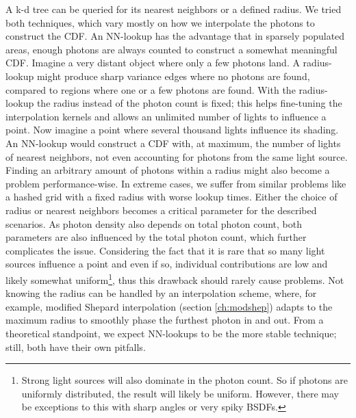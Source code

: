 A k-d tree can be queried for its nearest neighbors or a defined radius. We tried both techniques, which vary mostly on how we interpolate the photons to construct the CDF. An NN-lookup has the advantage that in sparsely populated areas, enough photons are always counted to construct a somewhat meaningful CDF. Imagine a very distant object where only a few photons land. A radius-lookup might produce sharp variance edges where no photons are found, compared to regions where one or a few photons are found. With the radius-lookup the radius instead of the photon count is fixed; this helps fine-tuning the interpolation kernels and allows an unlimited number of lights to influence a point. Now imagine a point where several thousand lights influence its shading. An NN-lookup would construct a CDF with, at maximum, the number of lights of nearest neighbors, not even accounting for photons from the same light source. Finding an arbitrary amount of photons within a radius might also become a problem performance-wise. In extreme cases, we suffer from similar problems like a hashed grid with a fixed radius with worse lookup times. Either the choice of radius or nearest neighbors becomes a critical parameter for the described scenarios. As photon density also depends on total photon count, both parameters are also influenced by the total photon count, which further complicates the issue. Considering the fact that it is rare that so many light sources influence a point and even if so, individual contributions are low and likely somewhat uniform\footnote{Strong light sources will also dominate in the photon count. So if photons are uniformly distributed, the result will likely be uniform. However, there may be exceptions to this with sharp angles or very spiky BSDFs.}, thus this drawback should rarely cause problems. Not knowing the radius can be handled by an interpolation scheme, where, for example, modified Shepard interpolation (section \ref{ch:modshep}) adapts to the maximum radius to smoothly phase the furthest photon in and out. From a theoretical standpoint, we expect NN-lookups to be the more stable technique; still, both have their own pitfalls. 

